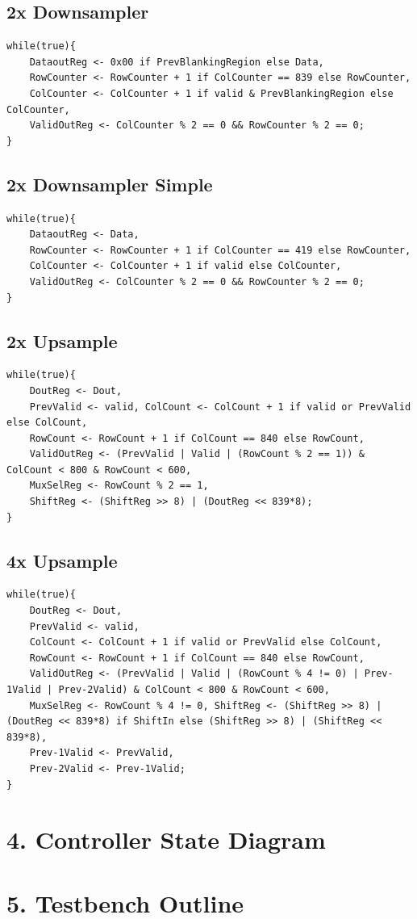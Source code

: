 \documentclass[11pt]{article}
\begin{document}
\subsection*{2x Downsampler}
\begin{lstlisting}
while(true){
    DataoutReg <- 0x00 if PrevBlankingRegion else Data,
    RowCounter <- RowCounter + 1 if ColCounter == 839 else RowCounter,
    ColCounter <- ColCounter + 1 if valid & PrevBlankingRegion else ColCounter,
    ValidOutReg <- ColCounter % 2 == 0 && RowCounter % 2 == 0;
}
\end{lstlisting}

\subsection*{2x Downsampler Simple}
\begin{lstlisting}
while(true){
    DataoutReg <- Data,
    RowCounter <- RowCounter + 1 if ColCounter == 419 else RowCounter,
    ColCounter <- ColCounter + 1 if valid else ColCounter,
    ValidOutReg <- ColCounter % 2 == 0 && RowCounter % 2 == 0;
}
\end{lstlisting}

\subsection*{2x Upsample}
\begin{lstlisting}
while(true){
    DoutReg <- Dout, 
    PrevValid <- valid, ColCount <- ColCount + 1 if valid or PrevValid else ColCount, 
    RowCount <- RowCount + 1 if ColCount == 840 else RowCount, 
    ValidOutReg <- (PrevValid | Valid | (RowCount % 2 == 1)) & ColCount < 800 & RowCount < 600, 
    MuxSelReg <- RowCount % 2 == 1, 
    ShiftReg <- (ShiftReg >> 8) | (DoutReg << 839*8);
}
\end{lstlisting}

\subsection*{4x Upsample}
\begin{lstlisting}
while(true){
    DoutReg <- Dout, 
    PrevValid <- valid, 
    ColCount <- ColCount + 1 if valid or PrevValid else ColCount, 
    RowCount <- RowCount + 1 if ColCount == 840 else RowCount, 
    ValidOutReg <- (PrevValid | Valid | (RowCount % 4 != 0) | Prev-1Valid | Prev-2Valid) & ColCount < 800 & RowCount < 600, 
    MuxSelReg <- RowCount % 4 != 0, ShiftReg <- (ShiftReg >> 8) | (DoutReg << 839*8) if ShiftIn else (ShiftReg >> 8) | (ShiftReg << 839*8), 
    Prev-1Valid <- PrevValid, 
    Prev-2Valid <- Prev-1Valid;
}
\end{lstlisting}


\section*{4. Controller State Diagram}

\section*{5. Testbench Outline}
\end{document}
